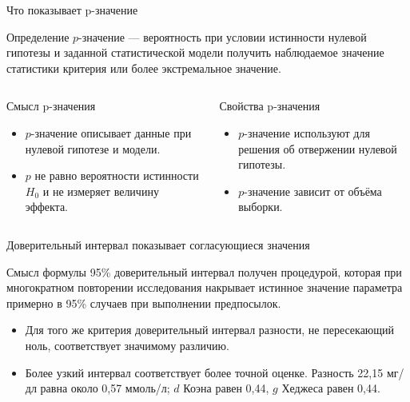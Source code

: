 \documentclass[aspectratio=169]{beamer}
\begin{document}
\begin{frame}{Что показывает p-значение}
  \begin{block}{Определение}
    $p$-значение — вероятность при условии истинности нулевой гипотезы и заданной статистической модели получить наблюдаемое значение статистики критерия или более экстремальное значение.
  \end{block}
  \begin{columns}[T,onlytextwidth]
      \begin{block}{Смысл p-значения}
        \begin{itemize}
          \item $p$-значение описывает данные при нулевой гипотезе и модели.
          \item $p$ не равно вероятности истинности $H_0$ и не измеряет величину эффекта.
        \end{itemize}
      \end{block}
      \begin{block}{Свойства p-значения}
        \begin{itemize}
          \item $p$-значение используют для решения об отвержении нулевой гипотезы.
          \item $p$-значение зависит от объёма выборки.
        \end{itemize}
      \end{block}
  \end{columns}
\end{frame}

\begin{frame}{Доверительный интервал показывает согласующиеся значения}
  \begin{block}{Смысл формулы}
    95\% доверительный интервал получен процедурой, которая при многократном повторении исследования накрывает истинное значение параметра примерно в 95\% случаев при выполнении предпосылок.
  \end{block}
  \begin{itemize}
    \item Для того же критерия доверительный интервал разности, не пересекающий ноль, соответствует значимому различию.
    \item Более узкий интервал соответствует более точной оценке. Разность 22,15 мг/дл равна около 0,57 ммоль/л; $d$ Коэна равен 0,44, $g$ Хеджеса равен 0,44.
  \end{itemize}
\end{frame}
\end{document}
